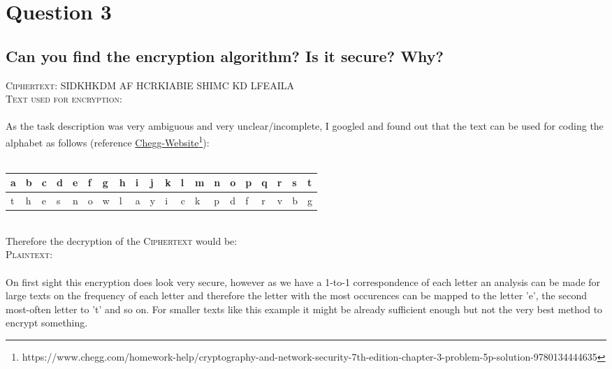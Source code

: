 \documentclass{report}
\begin{document}
	\section{Question 3}
	\startsection
		\renewcommand{\thesubsection}{\thesection.\Alph{subsection}}
		\subsection{Can you find the encryption algorithm? Is it secure? Why?}
		\startsubsection
			\textsc{Ciphertext}: SIDKHKDM AF HCRKIABIE SHIMC KD LFEAILA \\
			\textsc{Text used for encryption}:  \\ \\
			As the task description was very ambiguous and very unclear/incomplete, I googled and found out that the text can be used for coding the alphabet as follows (reference \href{https://www.chegg.com/homework-help/cryptography-and-network-security-7th-edition-chapter-3-problem-5p-solution-9780134444635}{Chegg-Website}\footnote{https://www.chegg.com/homework-help/cryptography-and-network-security-7th-edition-chapter-3-problem-5p-solution-9780134444635}): \\ \\
			\begin{tabular}{|M{0.3cm}|M{0.3cm}|M{0.3cm}|M{0.3cm}|M{0.3cm}|M{0.3cm}|M{0.3cm}|M{0.3cm}|M{0.3cm}|M{0.3cm}|M{0.3cm}|M{0.3cm}|M{0.3cm}|M{0.3cm}|M{0.3cm}|M{0.3cm}|M{0.3cm}|M{0.3cm}|M{0.3cm}|M{0.3cm}|}
				\hline
				a & b & c & d & e & f & g & h & i & j & k & l & m & n & o & p & q & r & s & t \\
				\hline
				t & h & e & s & n & o & w & l & a & y & i & c & k & p & d & f & r & v & b & g \\
				\hline
			\end{tabular}
			\hfill \\
			Therefore the decryption of the \textsc{Ciphertext} would be: \\
			\textsc{Plaintext}:  \\ \\
			On first sight this encryption does look very secure, however as we have a 1-to-1 correspondence of each letter an analysis can be made for large texts on the frequency of each letter and therefore the letter with the most occurences can be mapped to the letter 'e', the second most-often letter to 't' and so on. For smaller texts like this example it might be already sufficient enough but not the very best method to encrypt something.
		\closesection
\end{document}
